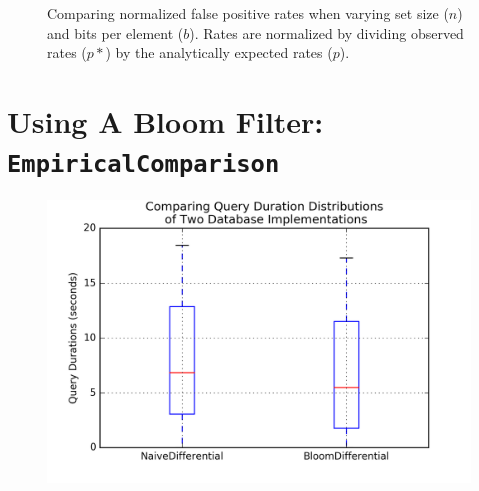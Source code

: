 \documentclass{article}
\begin{document}
\begin{figure}[h]
  \caption{Comparing normalized false positive rates when varying set size ($n$)
           and bits per element ($b$). Rates are normalized by dividing observed
           rates ($p*$) by the analytically expected rates ($p$).}
\end{figure}


\section{Using A Bloom Filter: \texttt{EmpiricalComparison}}
\begin{figure}[h]
  \includegraphics[width=\textwidth]{figures/empirical_comparison/query_duration_box_plot.png}
\end{figure}
\end{document}
